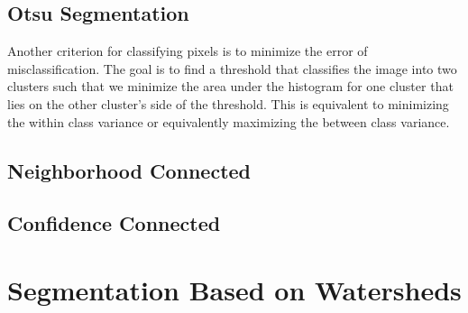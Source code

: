 \label{sec:ConnectedThreshold}


\subsection{Otsu Segmentation}
Another criterion for classifying pixels is to minimize the error of misclassification.
The goal is to find a threshold that classifies the image into two clusters such that 
we minimize the area under the histogram for one cluster that lies on the other cluster's 
side of the threshold. This is equivalent to minimizing the within class variance
or equivalently maximizing the between class variance.

\label{sec:OtsuThreshold}
\ifitkFullVersion 

\fi

\label{sec:OtsuMultipleThreshold}
\ifitkFullVersion 

\fi

\subsection{Neighborhood Connected}
\label{sec:NeighborhoodConnectedImageFilter}
\ifitkFullVersion 

\fi


\subsection{Confidence Connected}
\label{sec:ConfidenceConnected}
\ifitkFullVersion 

%
\fi




%


%


\section{Segmentation Based on Watersheds}
\label{sec:WatershedSegmentation}
\ifitkFullVersion 

\fi


